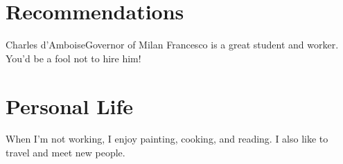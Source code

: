 \section{Recommendations}

  \begin{citedquote}{Charles d'Amboise}{Governor of Milan}
      Francesco is a great student and worker. You'd be a fool not to hire him!
  \end{citedquote}


\section{Personal Life}

  When I'm not working, I enjoy painting, cooking, and reading. I also like to travel and meet new people.


\makecontactinfo

\printbibliography[title={References}]



